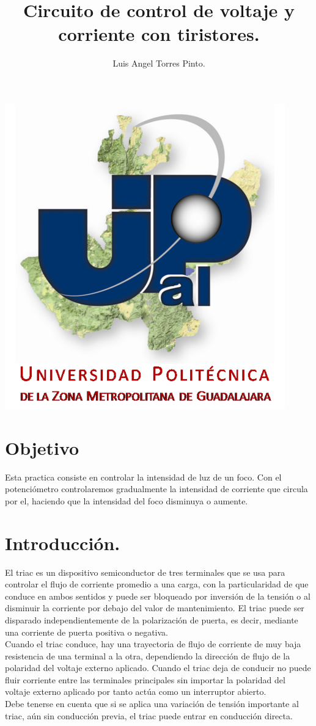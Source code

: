 \documentclass[10pt,a4paper]{article}
\author{Luis Angel Torres Pinto.}
\title{Circuito de control de voltaje y corriente con tiristores.}
\begin{document}
\maketitle
\centering
\includegraphics[scale=2]{upzmg.jpg}\\
\raggedright
\newpage 
\section{Objetivo }
Esta practica consiste en controlar la intensidad de luz de un foco. Con el potenciómetro controlaremos gradualmente la intensidad de corriente que circula por el, haciendo que la intensidad del foco disminuya o aumente.
\section{Introducción.}
El triac es un dispositivo semiconductor de tres terminales que se usa para controlar el flujo de corriente promedio a una carga, con la particularidad de que conduce en ambos sentidos y puede ser bloqueado por inversión de la tensión o al disminuir la corriente por debajo del valor de mantenimiento. El triac puede ser disparado independientemente de la polarización de puerta, es decir, mediante una corriente de puerta positiva o negativa.\\
\bigskip 
Cuando el triac conduce, hay una trayectoria de flujo de corriente de muy baja resistencia de una terminal a la otra, dependiendo la dirección de flujo de la polaridad del voltaje externo aplicado.
Cuando el triac deja de conducir no puede fluir corriente entre las terminales principales sin importar la polaridad del voltaje externo aplicado por tanto actúa como un interruptor abierto.\\
\bigskip 
Debe tenerse en cuenta que si se aplica una variación de tensión importante al triac, aún sin conducción previa, el triac puede entrar en conducción directa.
\end{document}
